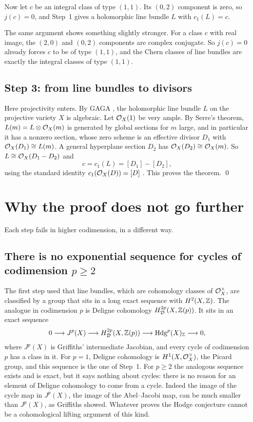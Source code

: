 Now let $c$ be an integral class of type $(1,1)$. Its $(0,2)$ component is
zero, so $j(c)=0$, and Step~1 gives a holomorphic line bundle $L$ with
$c_{1}(L)=c$.

The same argument shows something slightly stronger. For a class $c$ with
real image, the $(2,0)$ and $(0,2)$ components are complex conjugate. So
$j(c)=0$ already forces $c$ to be of type $(1,1)$, and the Chern classes of
line bundles are exactly the integral classes of type $(1,1)$.

\subsection*{Step 3: from line bundles to divisors}
Here projectivity enters. By GAGA \cite{Ser56}, the holomorphic line bundle
$L$ on the projective variety $X$ is algebraic. Let $\mathcal{O}_{X}(1)$ be very
ample. By Serre's theorem, $L(m)=L\otimes\mathcal{O}_{X}(m)$ is generated by global
sections for $m$ large, and in particular it has a nonzero section, whose
zero scheme is an effective divisor $D_{1}$ with $\mathcal{O}_{X}(D_{1})\cong L(m)$.
A general hyperplane section $D_{2}$ has $\mathcal{O}_{X}(D_{2})\cong\mathcal{O}_{X}(m)$. So
$L\cong\mathcal{O}_{X}(D_{1}-D_{2})$ and
\[
  c=c_{1}(L)=[D_{1}]-[D_{2}],
\]
using the standard identity $c_{1}(\mathcal{O}_{X}(D))=[D]$ \cite[p.~141]{GH78}.
This proves the theorem. \qed

\section{Why the proof does not go further}

Each step fails in higher codimension, in a different way.

\subsection*{There is no exponential sequence for cycles of codimension $p\ge2$}
The first step used that line bundles, which are cohomology classes of
$\mathcal{O}_{X}^{\times}$, are classified by a group that sits in a long exact
sequence with $H^{2}(X,\mathbb{Z})$. The analogue in codimension $p$ is Deligne
cohomology $H^{2p}_{\mathcal D}(X,\mathbb{Z}(p))$. It sits in an exact sequence
\[
  0\longrightarrow J^{p}(X)\longrightarrow H^{2p}_{\mathcal D}(X,\mathbb{Z}(p))
  \longrightarrow\operatorname{Hdg}^{p}(X)_{\mathbb{Z}}\longrightarrow0,
\]
where $J^{p}(X)$ is Griffiths' intermediate Jacobian, and every cycle of
codimension $p$ has a class in it. For $p=1$, Deligne cohomology is
$H^{1}(X,\mathcal{O}_{X}^{\times})$, the Picard group, and this sequence is the one
of Step~1. For $p\ge2$ the analogous sequence exists and is exact, but it
says nothing about cycles: there is no reason for an element of Deligne
cohomology to come from a cycle. Indeed the image of the cycle map in
$J^{p}(X)$, the image of the Abel--Jacobi map, can be much smaller than
$J^{p}(X)$, as Griffiths showed. Whatever proves the Hodge conjecture
cannot be a cohomological lifting argument of this kind.

